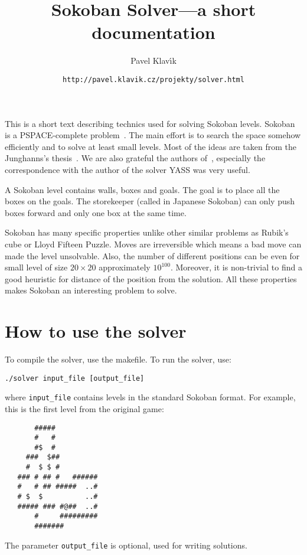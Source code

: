 \documentclass[twocolumn]{article}
\begin{document}
\title{\textsf{Sokoban Solver---a short documentation}}
\author{\textsf{Pavel Klav\'\i k}}
\date{{\tt http://pavel.klavik.cz/projekty/solver.html}}
\maketitle

This is a short text describing technics used for solving Sokoban levels. Sokoban is a \textsf{PSPACE}-complete problem~\cite{pspace}. The main
effort is to search the space somehow efficiently and to solve at least small levels. Most of the ideas are taken from the Junghanns's
thesis~\cite{junghanns}. We are also grateful the authors of~\cite{sokowiki}, especially the correspondence with the author of the solver YASS was
very useful.

A Sokoban level contains walls, boxes and goals. The goal is to place all the boxes on the goals. The storekeeper (called in Japanese Sokoban) can
only push boxes forward and only one box at the same time.

Sokoban has many specific properties unlike other similar problems as Rubik's cube or Lloyd Fifteen Puzzle. Moves are irreversible which means a bad
move can made the level unsolvable. Also, the number of different positions can be even for small level of size $20 \times 20$ approximately
$10^{100}$.  Moreover, it is non-trivial to find a good heuristic for distance of the position from the solution. All these properties makes Sokoban
an interesting problem to solve.

\section{How to use the solver}

To compile the solver, use the makefile. To run the solver, use:
\begin{verbatim}
./solver input_file [output_file]
\end{verbatim}
where \verb|input_file| contains levels in the standard Sokoban format. For example, this is the first level from the original game:
\begin{verbatim}
       #####
       #   #   
       #$  #
     ###  $## 
     #  $ $ # 
   ### # ## #   ######
   #   # ## #####  ..# 
   # $  $          ..#
   ##### ### #@##  ..# 
       #     #########
       #######
\end{verbatim}
The parameter \verb|output_file| is optional, used for writing solutions.
\end{document}
